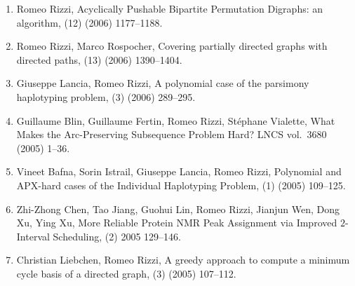 \documentclass[11pt]{article}
\begin{document}
\begin{enumerate}
  \item {\sc Romeo Rizzi},
   \newblock  Acyclically Pushable Bipartite Permutation Digraphs: an algorithm,
   (12) (2006) 1177--1188.

  \item {\sc Romeo Rizzi, Marco Rospocher},
   \newblock  Covering partially directed graphs with directed paths,
   (13) (2006) 1390--1404.

  \item {\sc Giuseppe Lancia, Romeo Rizzi},
   \newblock  A polynomial case of the parsimony haplotyping problem,
   (3) (2006) 289--295.

  \item {\sc Guillaume Blin, Guillaume Fertin, Romeo Rizzi,
                  St\'ephane Vialette},
   \newblock What Makes the Arc-Preserving Subsequence Problem Hard?
   \newblock  LNCS vol.~3680 (2005) 1--36.

  \item {\sc Vineet Bafna, Sorin Istrail, Giuseppe Lancia, Romeo Rizzi},
   \newblock  Polynomial and APX-hard cases of the Individual Haplotyping Problem,
   (1) (2005) 109--125.

  \item {\sc Zhi-Zhong Chen, Tao Jiang, Guohui Lin, Romeo Rizzi,
                  Jianjun Wen, Dong Xu, Ying Xu},
   \newblock  More Reliable Protein NMR Peak Assignment via Improved $2$-Interval Scheduling,
   (2) 2005 129--146.

  \item {\sc Christian Liebchen, Romeo Rizzi},
   \newblock  A greedy approach to compute a minimum cycle basis
              of a directed graph,
   (3) (2005) 107--112.


\end{enumerate}
\end{document}
